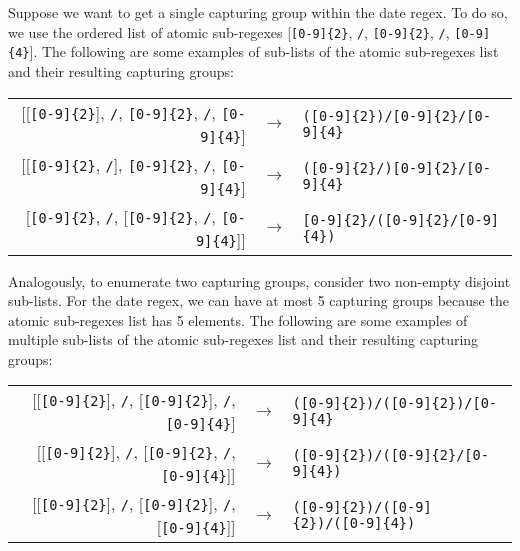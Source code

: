 \begin{example}
Suppose we want to get a single capturing group within the date regex. %
To do so, we use the ordered list of atomic sub-regexes [\verb![0-9]{2}!, \verb!/!, \verb![0-9]{2}!, \verb!/!, \verb![0-9]{4}!].
The following are some examples of sub-lists of the atomic sub-regexes list and their resulting capturing groups:

\begin{center}
\setlength{\extrarowheight}{10pt}
\begin{tabular}{rcl}
[[\verb![0-9]{2}!], \verb!/!, \verb![0-9]{2}!, \verb!/!, \verb![0-9]{4}!] & $\rightarrow$ & \verb!([0-9]{2})/[0-9]{2}/[0-9]{4}! \\

[[\verb![0-9]{2}!, \verb!/!], \verb![0-9]{2}!, \verb!/!, \verb![0-9]{4}!] & $\rightarrow$ & \verb!([0-9]{2}/)[0-9]{2}/[0-9]{4}! \\

[\verb![0-9]{2}!, \verb!/!, [\verb![0-9]{2}!, \verb!/!, \verb![0-9]{4}!]] & $\rightarrow$ & \verb![0-9]{2}/([0-9]{2}/[0-9]{4})!
\end{tabular}\bigskip
\end{center}

\noindent
Analogously, to enumerate two capturing groups, consider two non-empty disjoint sub-lists. For the date regex, we can have at most 5 capturing groups because the atomic sub-regexes list has 5 elements. The following are some examples of multiple sub-lists of the atomic sub-regexes list and their resulting capturing groups:

\begin{center}
\setlength{\extrarowheight}{10pt}
\begin{tabular}{rcl}
[[\verb![0-9]{2}!], \verb!/!, [\verb![0-9]{2}!], \verb!/!, \verb![0-9]{4}!] & $\rightarrow$ & \verb!([0-9]{2})/([0-9]{2})/[0-9]{4}! \\

[[\verb![0-9]{2}!], \verb!/!, [\verb![0-9]{2}!, \verb!/!, \verb![0-9]{4}!]] & $\rightarrow$ & \verb!([0-9]{2})/([0-9]{2}/[0-9]{4})! \\

[[\verb![0-9]{2}!], \verb!/!, [\verb![0-9]{2}!], \verb!/!, [\verb![0-9]{4}!]] & $\rightarrow$ & \verb!([0-9]{2})/([0-9]{2})/([0-9]{4})!
\end{tabular}\bigskip
\end{center}
\end{example}

